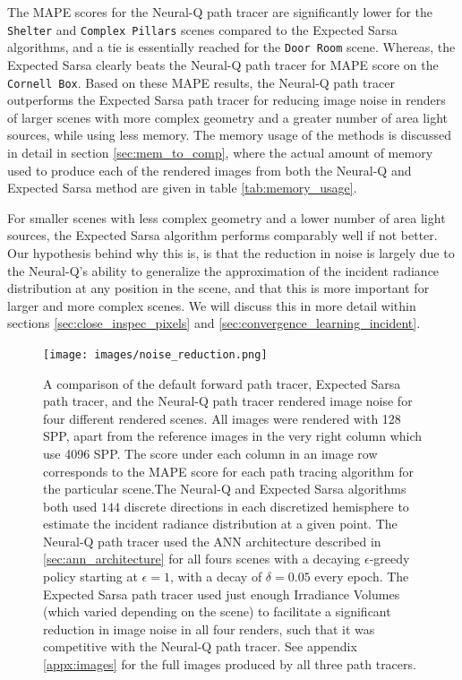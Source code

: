 \documentclass[../dissertation.tex]{subfiles}
\begin{document}
The MAPE scores for the Neural-Q path tracer are significantly lower for the \verb|Shelter| and \verb|Complex Pillars| scenes compared to the Expected Sarsa algorithms, and a tie is essentially reached for the \verb|Door Room| scene. Whereas, the Expected Sarsa clearly beats the Neural-Q path tracer for MAPE score on the \verb|Cornell Box|. Based on these MAPE results, the Neural-Q path tracer outperforms the Expected Sarsa path tracer for reducing image noise in renders of larger scenes with more complex geometry and a greater number of area light sources, while using less memory. The memory usage of the methods is discussed in detail in section \ref{sec:mem_to_comp}, where the actual amount of memory used to produce each of the rendered images from both the Neural-Q and Expected Sarsa method are given in table \ref{tab:memory_usage}. 

For smaller scenes with less complex geometry and a lower number of area light sources, the Expected Sarsa algorithm performs comparably well if not better. Our hypothesis behind why this is, is that the reduction in noise is largely due to the Neural-Q's ability to generalize the approximation of the incident radiance distribution at any position in the scene, and that this is more important for larger and more complex scenes. We will discuss this in more detail within sections \ref{sec:close_inspec_pixels} and \ref{sec:convergence_learning_incident}.

\begin{figure}[hbtp]
\begin{center}
\texttt{[image: images/noise\_reduction.png]}    
\end{center}
\caption{A comparison of the default forward path tracer, Expected Sarsa path tracer, and the Neural-Q path tracer rendered image noise for four different rendered scenes. All images were rendered with 128 SPP, apart from the reference images in the very right column which use 4096 SPP. The score under each column in an image row corresponds to the MAPE score for each  path tracing algorithm for the particular scene.The Neural-Q and Expected Sarsa algorithms both used $144$ discrete directions in each discretized hemisphere to estimate the incident radiance distribution at a given point. The Neural-Q path tracer used the ANN architecture described in \ref{sec:ann_architecture} for all fours scenes with a decaying $\epsilon$-greedy policy starting at $\epsilon =1$, with a decay of $\delta = 0.05$ every epoch. The Expected Sarsa path tracer used just enough Irradiance Volumes (which varied depending on the scene) to facilitate a significant reduction in image noise in all four renders, such that it was competitive with the Neural-Q path tracer. See appendix \ref{appx:images} for the full images produced by all three path tracers.}
\label{fig:mape_results_grid}
\end{figure}
\end{document}
